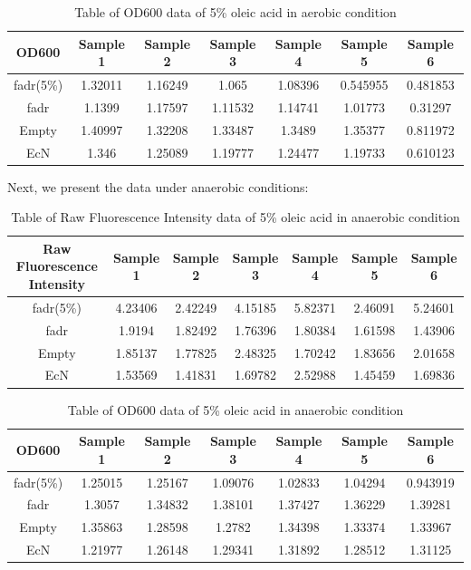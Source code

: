 \documentclass[UTF8]{article}
\begin{document}
\begin{table}[h]
	\centering
	\begin{tabular}{|c|c|c|c|c|c|c|}
		\hline
		OD600 & Sample 1 & Sample 2 & Sample 3 & Sample 4 & Sample 5 & Sample 6 \\ \hline
		fadr(5\%) & 1.32011 & 1.16249 & 1.065 & 1.08396 & 0.545955 & 0.481853 \\ \hline
		fadr & 1.1399 & 1.17597 & 1.11532 & 1.14741 & 1.01773 & 0.31297 \\ \hline
		Empty & 1.40997 & 1.32208 & 1.33487 & 1.3489 & 1.35377 & 0.811972 \\ \hline
		EcN & 1.346 & 1.25089 & 1.19777 & 1.24477 & 1.19733 & 0.610123 \\ \hline
	\end{tabular}
	\caption{Table of OD600 data of 5\% oleic acid in aerobic condition}
\end{table}

Next, we present the data under anaerobic conditions:

\begin{table}[h]
	\centering
	\begin{tabular}{|c|c|c|c|c|c|c|}
		\hline
		Raw Fluorescence Intensity & Sample 1 & Sample 2 & Sample 3 & Sample 4 & Sample 5 & Sample 6 \\ \hline
		fadr(5\%) & 4.23406 & 2.42249 & 4.15185 & 5.82371 & 2.46091 & 5.24601 \\ \hline
		fadr & 1.9194 & 1.82492 & 1.76396 & 1.80384 & 1.61598 & 1.43906 \\ \hline
		Empty & 1.85137 & 1.77825 & 2.48325 & 1.70242 & 1.83656 & 2.01658 \\ \hline
		EcN & 1.53569 & 1.41831 & 1.69782 & 2.52988 & 1.45459 & 1.69836 \\ \hline
	\end{tabular}
	\caption{Table of Raw Fluorescence Intensity data of 5\% oleic acid in anaerobic condition}
\end{table}

\begin{table}[h]
	\centering
	\begin{tabular}{|c|c|c|c|c|c|c|}
		\hline
		OD600 & Sample 1 & Sample 2 & Sample 3 & Sample 4 & Sample 5 & Sample 6 \\ \hline
		fadr(5\%) & 1.25015 & 1.25167 & 1.09076 & 1.02833 & 1.04294 & 0.943919 \\ \hline
		fadr & 1.3057 & 1.34832 & 1.38101 & 1.37427 & 1.36229 & 1.39281 \\ \hline
		Empty & 1.35863 & 1.28598 & 1.2782 & 1.34398 & 1.33374 & 1.33967 \\ \hline
		EcN & 1.21977 & 1.26148 & 1.29341 & 1.31892 & 1.28512 & 1.31125 \\ \hline
	\end{tabular}
	\caption{Table of OD600 data of 5\% oleic acid in anaerobic condition}
\end{table}
\end{document}
